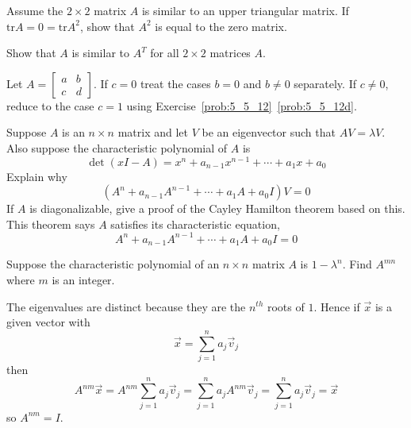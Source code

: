 \documentclass{ximera}
\begin{document}
\begin{problem}
Assume the $2 \times 2$ matrix $A$ is similar to an upper triangular matrix. If $\mbox{tr} A = 0 = \mbox{tr} A^{2}$, show that $A^{2}$ is equal to the zero matrix.
\end{problem}

\begin{problem}
Show that $A$ is similar to $A^{T}$ for all $2 \times 2$ matrices $A$. 
\begin{hint}
Let $A =\begin{bmatrix}
a & b \\
c & d
\end{bmatrix}$. If $c = 0$ treat the cases $b = 0$ and $b \neq 0$ separately. If $c \neq 0$, reduce to the case $c = 1$ using Exercise~\ref{prob:5_5_12}~\ref{prob:5_5_12d}.
\end{hint}
\end{problem}

\begin{problem}\label{prb:8.26} Suppose $A$ is an $n\times n$ matrix and let $V$ be an
eigenvector such that $AV=\lambda V$. Also suppose the
characteristic polynomial of $A$ is
\begin{equation*}
\det \left( x I-A\right) =x ^{n}+a_{n-1} x ^{n-1}+\cdots
+a_{1}x +a_{0}
\end{equation*}
Explain why
\begin{equation*}
\left( A^{n}+a_{n-1}A^{n-1}+\cdots +a_{1}A+a_{0}I\right) V=0
\end{equation*}
If $A$ is diagonalizable, give a proof of the Cayley Hamilton
theorem based on this. This theorem says $A$ satisfies its
characteristic equation,
\begin{equation*}
A^{n}+a_{n-1}A^{n-1}+\cdots +a_{1}A+a_{0}I=0
\end{equation*}
\end{problem}

\begin{problem}\label{prb:8.27} Suppose the characteristic polynomial of an $n\times n$ matrix $A$ is
$1-\lambda^{n}$. Find $A^{mn}$ where $m$ is an integer.
\begin{hint}
The eigenvalues are distinct because
they are the $n^{th}$ roots of $1$. Hence if $\vec{x}$ is a given vector with
\[
\vec{x}=\sum_{j=1}^{n}a_{j}\vec{v}_{j}
\]
then
\[
A^{nm}\vec{x}=A^{nm}\sum_{j=1}^{n}a_{j}\vec{v}_{j}=
\sum_{j=1}^{n}a_{j}A^{nm}\vec{v}_{j}=\sum_{j=1}^{n}a_{j}\vec{v}_{j}=\vec{x}
\]
so $A^{nm}=I$.
\end{hint}
\end{problem}
\end{document}
